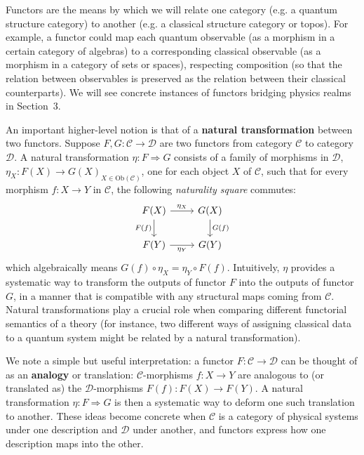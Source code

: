 \vspace{1em}
Functors are the means by which we will relate one category (e.g. a quantum structure category) to another (e.g. a classical structure category or topos). For example, a functor could map each quantum observable (as a morphism in a certain category of algebras) to a corresponding classical observable (as a morphism in a category of sets or spaces), respecting composition (so that the relation between observables is preserved as the relation between their classical counterparts). We will see concrete instances of functors bridging physics realms in Section~3.

\vspace{1em}
An important higher-level notion is that of a \textbf{natural transformation} between two functors. Suppose $F, G: \mathcal{C} \to \mathcal{D}$ are two functors from category $\mathcal{C}$ to category $\mathcal{D}$. A natural transformation $\eta: F \Rightarrow G$ consists of a family of morphisms in $\mathcal{D}$, ${\eta_X: F(X) \to G(X)}_{X \in \mathrm{Ob}(\mathcal{C})}$, one for each object $X$ of $\mathcal{C}$, such that for every morphism $f: X \to Y$ in $\mathcal{C}$, the following \emph{naturality square} commutes:
\begin{equation}\label{diag:naturality}
\begin{tikzcd}
F(X) \arrow[r, "\eta_X"] \arrow[d, "F(f)"'] & G(X) \arrow[d, "G(f)"] \\
F(Y) \arrow[r, "\eta_Y"'] & G(Y)
\end{tikzcd}
\end{equation}
which algebraically means $G(f)\circ \eta_X = \eta_Y \circ F(f)$. Intuitively, $\eta$ provides a systematic way to transform the outputs of functor $F$ into the outputs of functor $G$, in a manner that is compatible with any structural maps coming from $\mathcal{C}$. Natural transformations play a crucial role when comparing different functorial semantics of a theory (for instance, two different ways of assigning classical data to a quantum system might be related by a natural transformation).

\vspace{1em}
We note a simple but useful interpretation: a functor $F: \mathcal{C}\to \mathcal{D}$ can be thought of as an \textbf{analogy} or translation: $\mathcal{C}$-morphisms $f: X\to Y$ are analogous to (or translated as) the $\mathcal{D}$-morphisms $F(f): F(X)\to F(Y)$. A natural transformation $\eta: F\Rightarrow G$ is then a systematic way to deform one such translation to another. These ideas become concrete when $\mathcal{C}$ is a category of physical systems under one description and $\mathcal{D}$ under another, and functors express how one description maps into the other.


